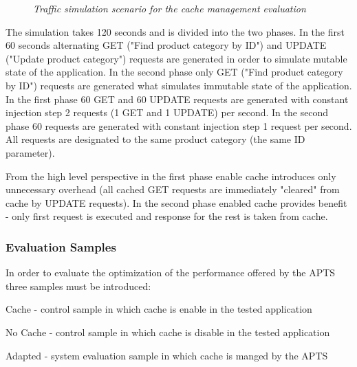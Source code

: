 \documentclass[12pt,a4paper]{article}
\let\tempone\itemize
\let\temptwo\enditemize
\renewenvironment{itemize}{\tempone\addtolength{\itemsep}{-0.4\baselineskip}}{\temptwo}
\begin{document}
\begin{figure}[!htb]
\caption{\textit{Traffic simulation scenario for the cache management evaluation}} \label{trafficcache}
\end{figure}

The simulation takes 120 seconds and is divided into the two phases. In the first 60 seconds alternating GET ("Find product category by ID") and UPDATE ("Update product category") requests are generated in order to simulate mutable state of the application. In the second phase only GET ("Find product category by ID") requests are generated what simulates immutable state of the application. In the first phase 60 GET and 60 UPDATE requests are generated with constant injection step 2 requests (1 GET and 1 UPDATE) per second. In the second phase 60 requests are generated with constant injection step 1 request per second. All requests are designated to the same product category (the same ID parameter). 

From the high level perspective in the first phase enable cache introduces only unnecessary overhead (all cached GET requests are immediately "cleared" from cache by UPDATE requests). In the second phase enabled cache provides benefit - only first request is executed and response for the rest is taken from cache.  

\subsubsection{Evaluation Samples} \label{evaluationsamplescache}

In order to evaluate the optimization of the performance offered by the APTS three  samples must be introduced: 
\begin{itemize}
\item Cache - control sample in which cache is enable in the tested application
\item No Cache - control sample in which cache is disable in the tested application
\item Adapted - system evaluation sample in which cache is manged by the APTS
\end{itemize}
\end{document}
